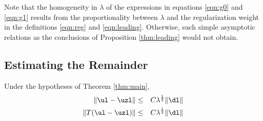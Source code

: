  Note that the homogeneity in $\lambda$ of the
expressions in equations \ref{eqn:g0} and \ref{eqn:g1} results from
the proportionality between $\lambda$ and the regularization weight in
the definitions \ref{eqn:reg} and \ref{eqn:leading}. Otherwise, such
simple asymptotic relations as the conclusions
of Proposition \ref{thm:leading} would not obtain.

\subsection{Estimating the Remainder}

\begin{prop}
  \label{thm:remest}
  Under the hypotheses of Theorem \ref{thm:main},
  \begin{eqnarray}
    \|\ul-\uzl\| &\le& C \lambda^{\frac{1}{2}}\|\dl\|\label{eqn:diffu} \\
    \|T(\ul-\uzl)\| &\le& C \lambda^{\frac{1}{2}}\|\dl\|\label{eqn:difftu}
  \end{eqnarray}
\end{prop}

